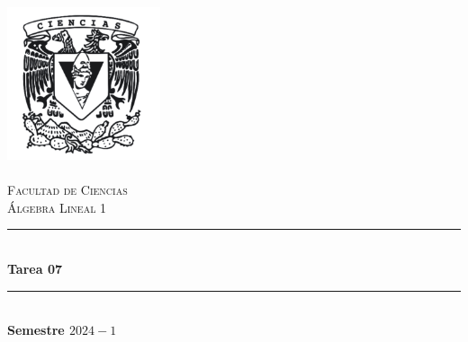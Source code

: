 \begin{titlepage}
\center 
\newcommand{\HRule}{\rule{\linewidth}{0.5mm}} 

\includegraphics[width=4.5cm]{IMA/Ciencias.png} \\ 
\quad \\[1.5cm]

\textsc{\Large Facultad de Ciencias}\\[0.5cm] 
\textsc{\Large Álgebra Lineal 1}\\[0.5cm] 

\makeatletter
    \HRule \\ [0.4cm]
        { \huge \bfseries Tarea 07}\\
    \HRule \\ [0.4cm]
\large\textbf{Semestre $2024-1$}\\


\end{titlepage}
